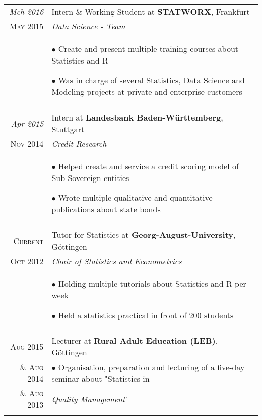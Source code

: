\documentclass[a4paper,10pt]{article} %
\begin{document}
\begin{tabular}{r|p{11cm}}


\emph{Mch 2016} & Intern \& Working Student at \textbf{STATWORX}, Frankfurt\\
\textsc{May 2015} & \emph{Data Science - Team} \\
& \footnotesize{
$\bullet$ Create and present multiple training courses about Statistics and R

$\bullet$ Was in charge of several Statistics, Data Science and Modeling projects at private and enterprise customers}\\
\multicolumn{2}{c}{} \\



\emph{Apr 2015} & Intern at \textbf{Landesbank Baden-Württemberg}, Stuttgart\\
\textsc{Nov 2014} & \emph{Credit Research} \\
& \footnotesize{
$\bullet$ Helped create and service a credit scoring model of Sub-Sovereign entities

$\bullet$ Wrote multiple qualitative and quantitative publications about state bonds}\\
\multicolumn{2}{c}{} \\


\textsc{Current} & Tutor for Statistics at \textbf{Georg-August-University}, Göttingen\\
\textsc{Oct 2012} & \emph{Chair of Statistics and Econometrics}\\
& \footnotesize{
$\bullet$ Holding multiple tutorials about Statistics and R per week

$\bullet$ Held a statistics practical in front of 200 students}\\
\multicolumn{2}{c}{} \\


\textsc{Aug 2015} & Lecturer at \textbf{Rural Adult Education (LEB)}, Göttingen\\
\textsc{ \& Aug 2014}& $\bullet$ \footnotesize{Organisation, preparation and lecturing of a five-day seminar about "Statistics in} \\
\textsc{\& Aug 2013}& \footnotesize{\emph{Quality Management}"}\\
\multicolumn{2}{c}{} \\


\end{tabular}
\end{document}
